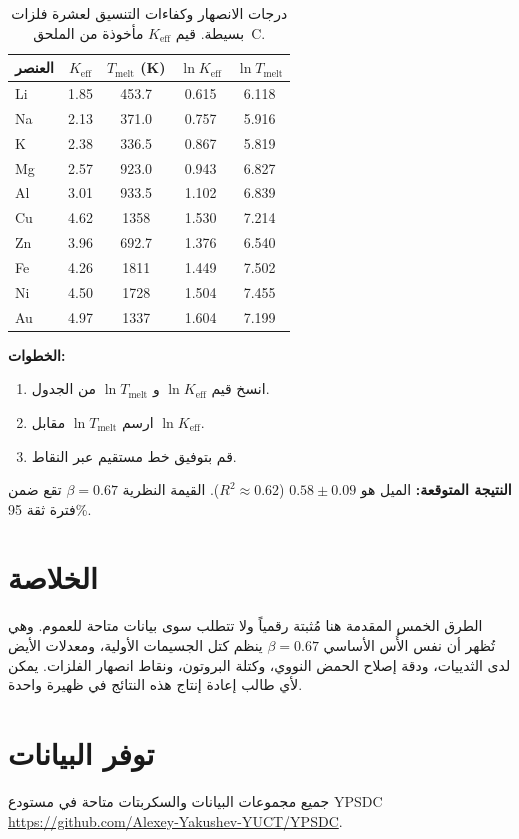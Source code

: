 \documentclass[12pt,a4paper]{article}
\newcommand{\Ke}{K_{\mathrm{eff}}}   %
\begin{document}
	\begin{table}[H]
		\centering
		\caption{درجات الانصهار وكفاءات التنسيق لعشرة فلزات بسيطة. قيم \(\Ke\) مأخوذة من الملحق~C.}
		\label{tab:melting}
		\begin{tabular}{l c c c c}
			\toprule
			العنصر & \(\Ke\) & \(T_{\text{melt}}\) (K) & \(\ln \Ke\) & \(\ln T_{\text{melt}}\) \\
			\midrule
			Li & 1.85 & 453.7 & 0.615 & 6.118 \\
			Na & 2.13 & 371.0 & 0.757 & 5.916 \\
			K  & 2.38 & 336.5 & 0.867 & 5.819 \\
			Mg & 2.57 & 923.0 & 0.943 & 6.827 \\
			Al & 3.01 & 933.5 & 1.102 & 6.839 \\
			Cu & 4.62 & 1358  & 1.530 & 7.214 \\
			Zn & 3.96 & 692.7 & 1.376 & 6.540 \\
			Fe & 4.26 & 1811  & 1.449 & 7.502 \\
			Ni & 4.50 & 1728  & 1.504 & 7.455 \\
			Au & 4.97 & 1337  & 1.604 & 7.199 \\
			\bottomrule
		\end{tabular}
	\end{table}
	
	\textbf{الخطوات:}
	\begin{enumerate}[label=(\arabic*)]
		\item انسخ قيم \(\ln \Ke\) و \(\ln T_{\text{melt}}\) من الجدول.
		\item ارسم \(\ln T_{\text{melt}}\) مقابل \(\ln \Ke\).
		\item قم بتوفيق خط مستقيم عبر النقاط.
	\end{enumerate}
	
	\textbf{النتيجة المتوقعة:} الميل هو \(0.58 \pm 0.09\) (\(R^2 \approx 0.62\)). القيمة النظرية \(\beta = 0.67\) تقع ضمن فترة ثقة 95\%.
	
	\section{الخلاصة}
	الطرق الخمس المقدمة هنا مُثبتة رقمياً ولا تتطلب سوى بيانات متاحة للعموم. وهي تُظهر أن نفس الأُس الأساسي \(\beta = 0.67\) ينظم كتل الجسيمات الأولية، ومعدلات الأيض لدى الثدييات، ودقة إصلاح الحمض النووي، وكتلة البروتون، ونقاط انصهار الفلزات. يمكن لأي طالب إعادة إنتاج هذه النتائج في ظهيرة واحدة.
	
	\section*{توفر البيانات}
	جميع مجموعات البيانات والسكربتات متاحة في مستودع YPSDC\\
	\url{https://github.com/Alexey-Yakushev-YUCT/YPSDC}.
	
\end{document}
